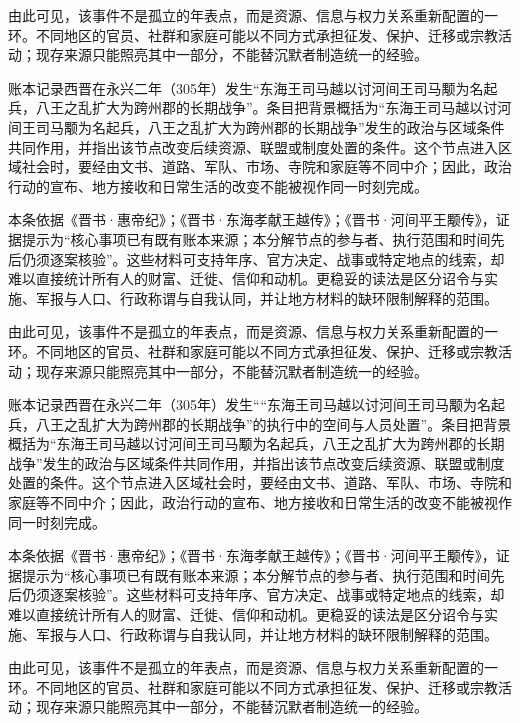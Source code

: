 由此可见，该事件不是孤立的年表点，而是资源、信息与权力关系重新配置的一环。不同地区的官员、社群和家庭可能以不同方式承担征发、保护、迁移或宗教活动；现存来源只能照亮其中一部分，不能替沉默者制造统一的经验。

账本记录西晋在永兴二年（305年）发生“东海王司马越以讨河间王司马颙为名起兵，八王之乱扩大为跨州郡的长期战争”。条目把背景概括为“东海王司马越以讨河间王司马颙为名起兵，八王之乱扩大为跨州郡的长期战争”发生的政治与区域条件共同作用，并指出该节点改变后续资源、联盟或制度处置的条件。这个节点进入区域社会时，要经由文书、道路、军队、市场、寺院和家庭等不同中介；因此，政治行动的宣布、地方接收和日常生活的改变不能被视作同一时刻完成。

本条依据《晋书·惠帝纪》；《晋书·东海孝献王越传》；《晋书·河间平王颙传》，证据提示为“核心事项已有既有账本来源；本分解节点的参与者、执行范围和时间先后仍须逐案核验”。这些材料可支持年序、官方决定、战事或特定地点的线索，却难以直接统计所有人的财富、迁徙、信仰和动机。更稳妥的读法是区分诏令与实施、军报与人口、行政称谓与自我认同，并让地方材料的缺环限制解释的范围。

由此可见，该事件不是孤立的年表点，而是资源、信息与权力关系重新配置的一环。不同地区的官员、社群和家庭可能以不同方式承担征发、保护、迁移或宗教活动；现存来源只能照亮其中一部分，不能替沉默者制造统一的经验。

账本记录西晋在永兴二年（305年）发生““东海王司马越以讨河间王司马颙为名起兵，八王之乱扩大为跨州郡的长期战争”的执行中的空间与人员处置”。条目把背景概括为“东海王司马越以讨河间王司马颙为名起兵，八王之乱扩大为跨州郡的长期战争”发生的政治与区域条件共同作用，并指出该节点改变后续资源、联盟或制度处置的条件。这个节点进入区域社会时，要经由文书、道路、军队、市场、寺院和家庭等不同中介；因此，政治行动的宣布、地方接收和日常生活的改变不能被视作同一时刻完成。

本条依据《晋书·惠帝纪》；《晋书·东海孝献王越传》；《晋书·河间平王颙传》，证据提示为“核心事项已有既有账本来源；本分解节点的参与者、执行范围和时间先后仍须逐案核验”。这些材料可支持年序、官方决定、战事或特定地点的线索，却难以直接统计所有人的财富、迁徙、信仰和动机。更稳妥的读法是区分诏令与实施、军报与人口、行政称谓与自我认同，并让地方材料的缺环限制解释的范围。

由此可见，该事件不是孤立的年表点，而是资源、信息与权力关系重新配置的一环。不同地区的官员、社群和家庭可能以不同方式承担征发、保护、迁移或宗教活动；现存来源只能照亮其中一部分，不能替沉默者制造统一的经验。

